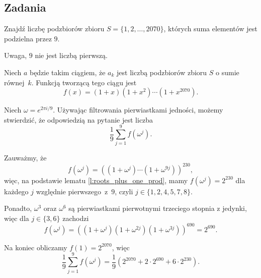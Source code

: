 \documentclass[bibliography=totocnumbered]{scrartcl}
\begin{document}
    \subsection{Zadania}
    \begin{problem}
        Znajdź liczbę podzbiorów zbioru $S = \{1,2,\ldots,2070\}$, których suma elementów jest podzielna przez $9$.
        \begin{hint}
            Uwaga, $9$ nie jest liczbą pierwszą.
        \end{hint}
        \begin{answer}
            Niech $a$ będzie takim ciągiem, że $a_k$ jest liczbą podzbiorów zbioru $S$ o sumie równej~$k$. Funkcją tworzącą tego ciągu jest
            $$ f(x) = (1 + x)(1 + x^2)\cdots(1 + x^{2070}). $$

            Niech $\omega = e^{2\pi i/9}$. Używając filtrowania pierwiastkami jedności, możemy stwierdzić, że odpowiedzią na pytanie jest liczba
            $$ \frac{1}{9}\sum_{j = 1}^9 f(\omega^j). $$

            Zauważmy, że
            $$ f(\omega^j) = \left((1 + \omega^j)\cdots(1 + \omega^{9j})\right)^{230}, $$
            więc, na podstawie lematu \ref{l:roots_plus_one_prod}, mamy $f(\omega^j) = 2^{230}$ dla każdego $j$ względnie pierwszego~z~$9$, czyli $j\in\{1,2,4,5,7,8\}$.

            Ponadto, $\omega^3$ oraz $\omega^6$ są pierwiastkami pierwotnymi trzeciego stopnia z jedynki, więc dla $j\in\{3,6\}$ zachodzi
            $$ f(\omega^j) = \left((1 + \omega^j)(1 + \omega^{2j})(1 + \omega^{3j})\right)^{690} = 2^{690}. $$

            Na koniec obliczamy $f(1) = 2^{2070}$, więc
            $$ \frac{1}{9}\sum_{j = 1}^9 f(\omega^j) = \frac{1}{9}\left(2^{2070} + 2\cdot 2^{690} + 6\cdot 2^{230}\right). $$
        \end{answer}
    \end{problem}
\end{document}
